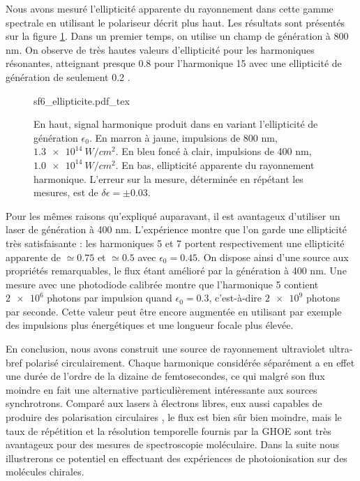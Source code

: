 Nous avons mesuré l'ellipticité apparente du rayonnement dans cette gamme spectrale en utilisant le polariseur décrit plus haut. Les résultats sont présentés sur la figure \ref{fig:sf6_ell}. Dans un premier temps, on utilise un champ de génération à 800 nm. On observe de très hautes valeurs d'ellipticité pour les harmoniques résonantes, atteignant presque 0.8 pour l'harmonique 15 avec une ellipticité de génération de seulement 0.2 . 

\begin{figure}[!ht]
\centering
\def\svgwidth{1\columnwidth}
{sf6_ellipticite.pdf_tex}
\caption{En haut, signal harmonique produit dans  en variant l'ellipticité de génération $\epsilon_0$. En marron à jaune, impulsions de 800 nm, $\SI{1.3e14}{W/cm^2}$. En bleu foncé à clair, impulsions de 400 nm, $\SI{1.0e14}{W/cm^2}$. En bas, ellipticité apparente du rayonnement harmonique. L'erreur sur la mesure, déterminée en répétant les mesures, est de $\delta\epsilon=\pm0.03$.}
\label{fig:sf6_ell}
\end{figure}

Pour les mêmes raisons qu'expliqué auparavant, il est avantageux d'utiliser un laser de génération à 400 nm. L'expérience montre que l'on garde une ellipticité très satisfaisante : les harmoniques 5 et 7 portent respectivement une ellipticité apparente de $\simeq 0.75$ et $\simeq 0.5$ avec $\epsilon_0=0.45$. On dispose ainsi d'une source aux propriétés remarquables, le flux étant amélioré par la génération à 400 nm. Une mesure avec une photodiode calibrée montre que l'harmonique 5 contient $\num{2e6}$ photons par impulsion quand $\epsilon_0=0.3$, c'est-à-dire $\num{2e9}$ photons par seconde. Cette valeur peut être encore augmentée en utilisant par exemple des impulsions plus énergétiques et une longueur focale plus élevée.

En conclusion, nous avons construit une source de rayonnement ultraviolet ultra-bref polarisé circulairement. Chaque harmonique considérée séparément a en effet une durée de l'ordre de la dizaine de femtosecondes, ce qui malgré son flux moindre en fait une alternative particulièrement intéressante aux sources synchrotrons. Comparé aux lasers à électrons libres, eux aussi capables de produire des polarisation circulaires , le flux est bien sûr bien moindre, mais le taux de répétition et la résolution temporelle fournis par la GHOE sont très avantageux pour des mesures de spectroscopie moléculaire. Dans la suite nous illustrerons ce potentiel en effectuant des expériences de photoionisation sur des molécules chirales. 
%
